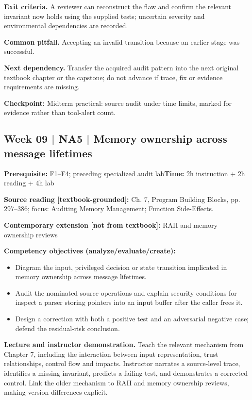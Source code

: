 \documentclass[10pt,letterpaper]{article}
\begin{document}
\textbf{Exit criteria.} A reviewer can reconstruct the flaw and confirm the relevant invariant now holds using the supplied tests; uncertain severity and environmental dependencies are recorded.

\textbf{Common pitfall.} Accepting an invalid transition because an earlier stage was successful.

\textbf{Next dependency.} Transfer the acquired audit pattern into the next original textbook chapter or the capstone; do not advance if trace, fix or evidence requirements are missing.

\begin{historynote}\textbf{Checkpoint:} Midterm practical: source audit under time limits, marked for evidence rather than tool-alert count.\end{historynote}
\subsection{Week 09 | NA5 | Memory ownership across message lifetimes}
\textbf{Prerequisite:} F1--F4; preceding specialized audit lab\hfill\textbf{Time:} 2h instruction + 2h reading + 4h lab

\textbf{Source reading [textbook-grounded]:} Ch. 7, Program Building Blocks, pp. 297--386; focus: Auditing Memory Management; Function Side-Effects.

\textbf{Contemporary extension [not from textbook]:} RAII and memory ownership reviews

\textbf{Competency objectives (analyze/evaluate/create):}
\begin{itemize}[leftmargin=*,itemsep=2pt]
\item Diagram the input, privileged decision or state transition implicated in memory ownership across message lifetimes.
\item Audit the nominated source operations and explain security conditions for inspect a parser storing pointers into an input buffer after the caller frees it.
\item Design a correction with both a positive test and an adversarial negative case; defend the residual-risk conclusion.
\end{itemize}
\textbf{Lecture and instructor demonstration.} Teach the relevant mechanism from Chapter 7, including the interaction between input representation, trust relationships, control flow and impacts. Instructor narrates a source-level trace, identifies a missing invariant, predicts a failing test, and demonstrates a corrected control. Link the older mechanism to RAII and memory ownership reviews, making version differences explicit.
\end{document}
